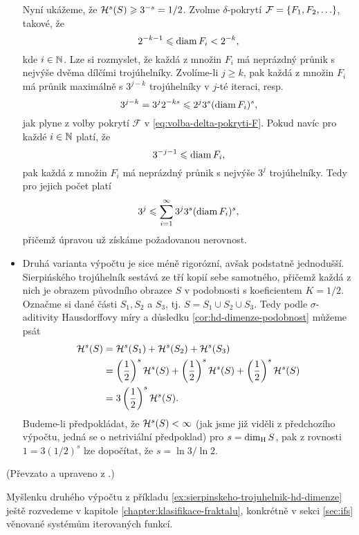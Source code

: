 \begin{example}
\begin{itemize}
        Nyní ukážeme, že $\mathcal{H}^{s}(S)\geqslant 3^{-s}=1/2$. Zvolme $\delta$-pokrytí $\mathcal{F}=\left\{F_1,F_2,\ldots\right\}$, takové, že
        \begin{equation}\label{eq:volba-delta-pokryti-F}
            2^{-k-1}\leqslant\operatorname{diam}{F_i}<2^{-k},
        \end{equation}
        kde $i\in\mathbb{N}$. Lze si rozmyslet, že každá z množin $F_i$ má neprázdný průnik s nejvýše dvěma dílčími trojúhelníky. Zvolíme-li $j\geqslant k$, pak každá z množin $F_i$ má průnik maximálně s $3^{j-k}$ trojúhelníky v $j$-té iteraci, resp.
        \[3^{j-k}=3^j2^{-ks}\leqslant2^j3^s(\operatorname{diam}{F_i})^s,\]
        jak plyne z volby pokrytí $\mathcal{F}$ v \eqref{eq:volba-delta-pokryti-F}. Pokud navíc pro každé $i\in\mathbb{N}$ platí, že
        \[3^{-j-1}\leqslant\operatorname{diam}{F_i},\]
        pak každá z množin $F_i$ má neprázdný průnik s nejvýše $3^j$ trojúhelníky. Tedy pro jejich počet platí
        \[3^j\leqslant\sum_{i=1}^{\infty}3^j3^s(\operatorname{diam}{F_i})^s,\]
        přičemž úpravou už získáme požadovanou nerovnost.
        \item Druhá varianta výpočtu je sice méně rigorózní, avšak podstatně jednodušší. Sierpińského trojúhelník sestává ze tří kopií sebe samotného, přičemž každá z nich je obrazem původního obrazce $S$ v podobnosti s koeficientem $K=1/2$. Označme si dané části $S_1,S_2$ a $S_3$, tj. $S=S_1\cup S_2\cup S_3$. Tedy podle $\sigma$-aditivity Hausdorffovy míry a důsledku \ref{cor:hd-dimenze-podobnost} můžeme psát
        \begin{align*}
            \mathcal{H}^{s}(S)&=\mathcal{H}^{s}(S_1)+\mathcal{H}^{s}(S_2)+\mathcal{H}^{s}(S_3)\\
            &=\left(\dfrac{1}{2}\right)^s\mathcal{H}^{s}(S)+\left(\dfrac{1}{2}\right)^s\mathcal{H}^{s}(S)+\left(\dfrac{1}{2}\right)^s\mathcal{H}^{s}(S)\\
            &=3\left(\dfrac{1}{2}\right)^s\mathcal{H}^{s}(S).
        \end{align*}
        Budeme-li předpokládat, že $\mathcal{H}^{s}(S)<\infty$ (jak jsme již viděli z předchozího výpočtu, jedná se o netriviální předpoklad) pro $s=\operatorname{dim_H}{S}$, pak z rovnosti $1=3(1/2)^s$ lze dopočítat, že $s=\ln{3}/\ln{2}$.
    \end{itemize}
\end{example}
(Převzato a upraveno z \citep[str. 53]{Falconer2014}.)

Myšlenku druhého výpočtu z příkladu \ref{ex:sierpinskeho-trojuhelnik-hd-dimenze} ještě rozvedeme v kapitole \ref{chapter:klasifikace-fraktalu}, konkrétně v sekci \ref{sec:ifs} věnované systémům iterovaných funkcí.


